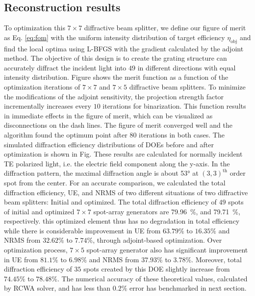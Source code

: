 \subsection{Reconstruction results}
To optimization this $7\times 7$ diffractive beam splitter, we define our figure of merit as Eq. \ref{eq:fom} with the uniform intensity distribution of target efficiency $\eta_\mathrm{obj}$ and find the local optima using L-BFGS with the gradient calculated by the adjoint method.
The objective of this design is to create the grating structure can accurately diffract the incident light into $49$ in different directions with equal intensity distribution.
Figure shows the merit function as a function of the optimization iterations of $7\times7$ and $7\times5$ diffractive beam splitters.
To minimize the modifications of the adjoint sensitivity, the projection strength factor incrementally increases every $10$ iterations for binarization.
This function results in immediate effects in the figure of merit, which can be visualized as disconnections on the dash lines.
The figure of merit converged well and the algorithm found the optimum point after $80$ iterations in both cases.
The simulated diffraction efficiency distributions of DOEs before and after optimization is shown in Fig. 
These results are calculated for normally incident TE polarized light, i.e. the electric field component along the y-axis.
In the diffraction pattern, the maximal diffraction angle is about \ang{53} at $(3,3)^\text{th}$  order spot from the center.
For an accurate comparison, we calculated the total diffraction efficiency, UE, and NRMS of two different situations of two diffractive beam splitters: Initial and optimized.
The total diffraction efficiency of $49$ spots of initial and optimized $7\times7$ spot-array generators are \SI{79.96}{\percent}, and \SI{79.71}{\percent}, respectively.
this optimized element thus has no degradation in total efficiency while there is considerable improvement in UE from $63.79\%$ to $16.35\%$ and NRMS from $32.62\%$ to $7.74\%$, through adjoint-based optimization.
Over optimization process, $7\times5$ spot-array generator also has significant improvement in UE from $81.1\%$ to $6.98\%$ and NRMS from $37.93\%$ to $3.78\%$.
Moreover, total diffraction efficiency of $35$ spots created by this DOE slightly increase from $74.45\%$ to $78.48\%$.
The numerical accuracy of these theoretical values, calculated by RCWA solver, and has less than $0.2\%$ error has benchmarked in next section.

